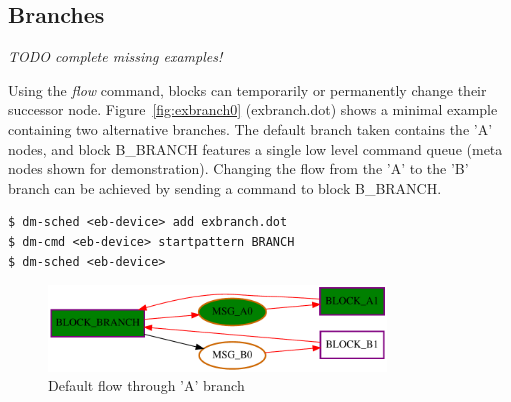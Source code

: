 \subsection{Branches}

\emph{TODO complete missing examples!}

Using the \emph{flow} command, blocks can temporarily or permanently change their successor node. Figure~\ref{fig:exbranch0} (exbranch.dot) shows a minimal example containing two alternative branches. The default branch taken contains the 'A' nodes, and block B\_BRANCH features a single low level command queue (meta nodes shown for demonstration). Changing the flow from the 'A' to the 'B' branch can be achieved by sending a command to block B\_BRANCH.


\begin{lstlisting}[style = customshell]
$ dm-sched <eb-device> add exbranch.dot
$ dm-cmd <eb-device> startpattern BRANCH
$ dm-sched <eb-device>
\end{lstlisting}

\begin{figure}[H]
   \centering
   \def\svgwidth{0.5\textwidth}
   \includegraphics*[width=0.8\textwidth,keepaspectratio]{Figures/exbranch1}
   \caption{ Default flow through 'A' branch }
   \label{fig:exbranch1}
\end{figure}



